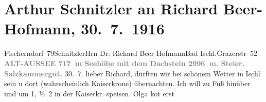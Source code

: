 

         
         \renewcommand{\erwaehntePersonen}{Personen: Richard Beer-Hofmann, Paula Beer-Hofmann, Olga Schnitzler}
         \renewcommand{\erwaehnteOrte}{Orte: Altaussee, Aschau, Bad Ischl, Dachstein, Fischerndorf, Grazer Straße, Hotel Kaiserkrone, Restaurant Sonnenschein, Salzkammergut}
         \renewcommand{\erwaehnteWerke}{}
               \section[Arthur Schnitzler an Richard Beer-Hofmann, 30. 7. 1916]{ Arthur Schnitzler an Richard Beer-Hofmann, 30. 7. 1916}\nopagebreak{}\rehead{ }\begin{ledgroupsized}[t]{13cm}\normalsize\beginnumbering \toendnotes[C]{\smallbreak\pagebreak[2]} 
\toendnotes[C]{\smallbreak}\pstart{}{\pb}Fischerndorf 79\pend{}\pstart{}Schnitzler\pend{}{\bigskip}\pstart{}Hrn Dr. Richard Beer-Hofmann\pend{}\pstart{}Bad Ischl.\pend{}\pstart{}Grazerstr 52\pend{}{\bigskip}\pstart
           \noindent{}\centering{}{\pb}\textcolor{gray}{\textbf{ALT-AUSSEE 717 m Seehöhe mit dem Dachstein
                     2996 m. Steier. Salzkammergut.}}\pend
           \pstart
           \raggedleft{}{\pb}30. 7.\pend
           \pstart
           lieber Richard, \label{KLL02235_Beer-Hofmann-1v}\label{KLL02235_Beer-Hofmann-1h} dürften wir bei schönem Wetter in Ischl
               sein u dort (wahrscheinlich Kaiserkrone)
               übernachten. Ich will zu Fuß hinüber und um 1, ½ 2 in der
                  Kaiserkr. speisen. Olga ko{\geminationm}t erst

\end{ledgroupsized}
